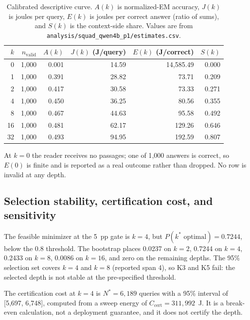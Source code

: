 \documentclass[a4paper,fleqn]{cas-sc}
\begin{document}
\begin{table}[pos=htbp]
  \centering
  \caption{Calibrated descriptive curve. $A(k)$ is normalized-EM accuracy, $J(k)$ is joules per
  query, $E(k)$ is joules per correct answer (ratio of sums), and $S(k)$ is the context-side
  share. Values are from \texttt{analysis/squad\_qwen4b\_p1/estimates.csv}.}
  \label{tab:p1curve}
  \small
  \setlength{\tabcolsep}{4pt}
  \begin{tabular}{rrrrrr}
    \toprule
    \textbf{$k$} & \textbf{$n_{\mathrm{valid}}$} & \textbf{$A(k)$} & \textbf{$J(k)$ (J/query)} & \textbf{$E(k)$ (J/correct)} & \textbf{$S(k)$} \\
    \midrule
    0  & 1{,}000 & 0.001 & 14.59  & 14{,}585.49 & 0.000 \\
    1  & 1{,}000 & 0.391 & 28.82  & 73.71  & 0.209 \\
    2  & 1{,}000 & 0.417 & 30.58  & 73.33  & 0.271 \\
    4  & 1{,}000 & 0.450 & 36.25  & 80.56  & 0.355 \\
    8  & 1{,}000 & 0.467 & 44.63  & 95.58  & 0.492 \\
    16 & 1{,}000 & 0.481 & 62.17  & 129.26 & 0.646 \\
    32 & 1{,}000 & 0.493 & 94.95  & 192.59 & 0.807 \\
    \bottomrule
  \end{tabular}
\end{table}

At $k=0$ the reader receives no passages; one of 1{,}000 answers is correct, so $E(0)$ is finite
and is reported as a real outcome rather than dropped. No row is invalid at any depth.

\subsection{Selection stability, certification cost, and sensitivity}

The feasible minimizer at the 5~pp gate is $k=4$, but $P(k^{*}\text{ optimal})=0.7244$, below the
0.8 threshold. The bootstrap places 0.0237 on $k=2$, 0.7244 on $k=4$, 0.2433 on $k=8$, 0.0086
on $k=16$, and zero on the remaining depths. The 95\% selection set covers $k=4$ and $k=8$
(reported span 4), so K3 and K5 fail: the selected depth is not stable at the pre-specified
threshold.

The certification cost at $k=4$ is $N^{*}=6{,}189$ queries with a 95\% interval of
[5{,}697, 6{,}748], computed from a sweep energy of $C_{\mathrm{cert}}=311{,}992$~J. It is a
break-even calculation, not a deployment guarantee, and it does not certify the depth.
\end{document}
